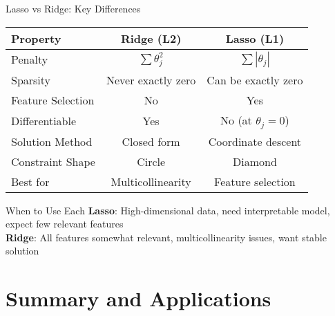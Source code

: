 \documentclass{beamer}
\begin{document}
\begin{frame}{Lasso vs Ridge: Key Differences}
\begin{table}[h]
\centering
\begin{tabular}{|l|c|c|}
\hline
\textbf{Property} & \textbf{Ridge (L2)} & \textbf{Lasso (L1)} \\
\hline
Penalty & $\sum \theta_j^2$ & $\sum |\theta_j|$ \\
\hline
Sparsity & Never exactly zero & Can be exactly zero \\
\hline
Feature Selection & No & Yes \\
\hline
Differentiable & Yes & No (at $\theta_j = 0$) \\
\hline
Solution Method & Closed form & Coordinate descent \\
\hline
Constraint Shape & Circle & Diamond \\
\hline
Best for & Multicollinearity & Feature selection \\
\hline
\end{tabular}
\end{table}

\begin{keypointsbox}{When to Use Each}
{\small
\textbf{Lasso}: High-dimensional data, need interpretable model, expect few relevant features \\
\textbf{Ridge}: All features somewhat relevant, multicollinearity issues, want stable solution
}
\end{keypointsbox}
\end{frame}

\section{Summary and Applications}
\end{document}

